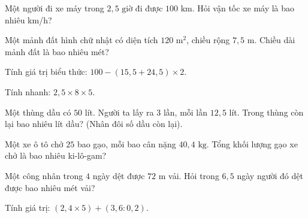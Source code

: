 \begin{ex}
  Một người đi xe máy trong $2{,}5\text{ giờ}$ đi được $100\text{ km}$. Hỏi vận tốc xe máy là bao nhiêu km/h?
\end{ex}

\begin{ex}
  Một mảnh đất hình chữ nhật có diện tích $120\text{ m}^2$, chiều rộng $7{,}5\text{ m}$. Chiều dài mảnh đất là bao nhiêu mét?
\end{ex}

\begin{ex}
  Tính giá trị biểu thức: $100 - (15{,}5 + 24{,}5) \times 2$.
\end{ex}

\begin{ex}
  Tính nhanh: $2{,}5 \times 8 \times 5$.
\end{ex}

\begin{ex}
  Một thùng dầu có $50$ lít. Người ta lấy ra $3$ lần, mỗi lần $12{,}5$ lít. Trong thùng còn lại bao nhiêu lít dầu? (Nhân đôi số dầu còn lại).
\end{ex}

\begin{ex}
  Một xe ô tô chở $25$ bao gạo, mỗi bao cân nặng $40{,}4\text{ kg}$. Tổng khối lượng gạo xe chở là bao nhiêu ki-lô-gam?
\end{ex}

\begin{ex}
  Một công nhân trong $4$ ngày dệt được $72\text{ m}$ vải. Hỏi trong $6{,}5$ ngày người đó dệt được bao nhiêu mét vải?
\end{ex}

\begin{ex}
  Tính giá trị: $(2{,}4 \times 5) + (3{,}6 : 0{,}2)$.
\end{ex}

